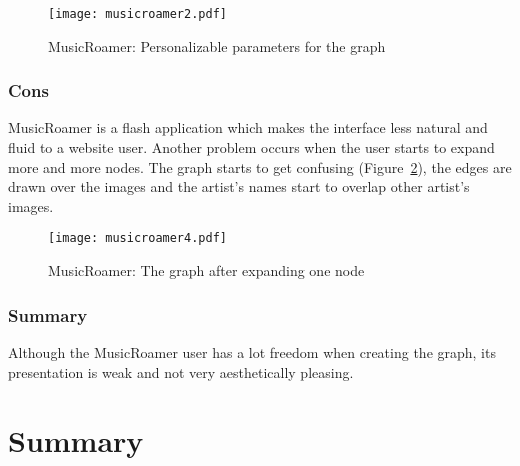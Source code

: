       \begin{figure}[H]
        \begin{center}
          \texttt{[image: musicroamer2.pdf]}
        \end{center}
        \caption{MusicRoamer: Personalizable parameters for the graph }
        \label{fig:sota_musicroamer3}
      \end{figure}


    \subsubsection{Cons} %
    \label{ssub:cons}

      MusicRoamer is a flash application which makes the interface less natural and fluid to a website user.
      Another problem occurs when the user starts to expand more and more nodes.
      The graph starts to get confusing (Figure~\ref{fig:sota_musicroamer4}), the edges are drawn over the images and the artist's names start to overlap other artist's images.

      \begin{figure}
        \begin{center}
          \texttt{[image: musicroamer4.pdf]}
        \end{center}
        \caption{MusicRoamer: The graph after expanding one node}
        \label{fig:sota_musicroamer4}
      \end{figure}


    \subsubsection{Summary} %
    \label{ssub:summary}

      Although the MusicRoamer user has a lot freedom when creating the graph, its presentation is weak and not very aesthetically pleasing.



  \clearpage




\section{Summary}

